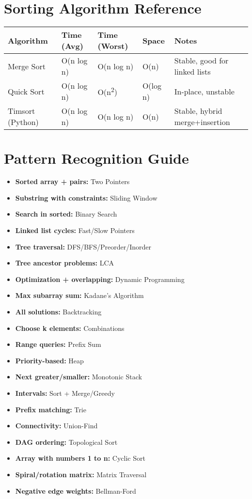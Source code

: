 \documentclass[8pt,landscape]{article}
\begin{document}
\begin{multicols}{3}
\section*{Sorting Algorithm Reference}
\begin{tabular}{|l|l|l|l|l|}
\hline
\textbf{Algorithm} & \textbf{Time (Avg)} & \textbf{Time (Worst)} & \textbf{Space} & \textbf{Notes} \\
\hline
Merge Sort & O(n log n) & O(n log n) & O(n) & Stable, good for linked lists \\
Quick Sort & O(n log n) & O(n\textsuperscript{2}) & O(log n) & In-place, unstable \\
Timsort (Python) & O(n log n) & O(n log n) & O(n) & Stable, hybrid merge+insertion \\
\hline
\end{tabular}

\section*{Pattern Recognition Guide}
\begin{itemize}
\item \textbf{Sorted array + pairs:} Two Pointers
\item \textbf{Substring with constraints:} Sliding Window
\item \textbf{Search in sorted:} Binary Search
\item \textbf{Linked list cycles:} Fast/Slow Pointers
\item \textbf{Tree traversal:} DFS/BFS/Preorder/Inorder
\item \textbf{Tree ancestor problems:} LCA
\item \textbf{Optimization + overlapping:} Dynamic Programming
\item \textbf{Max subarray sum:} Kadane's Algorithm
\item \textbf{All solutions:} Backtracking
\item \textbf{Choose k elements:} Combinations
\item \textbf{Range queries:} Prefix Sum
\item \textbf{Priority-based:} Heap
\item \textbf{Next greater/smaller:} Monotonic Stack
\item \textbf{Intervals:} Sort + Merge/Greedy
\item \textbf{Prefix matching:} Trie
\item \textbf{Connectivity:} Union-Find
\item \textbf{DAG ordering:} Topological Sort
\item \textbf{Array with numbers 1 to n:} Cyclic Sort
\item \textbf{Spiral/rotation matrix:} Matrix Traversal
\item \textbf{Negative edge weights:} Bellman-Ford
\end{itemize}


\end{multicols}
\end{document}
